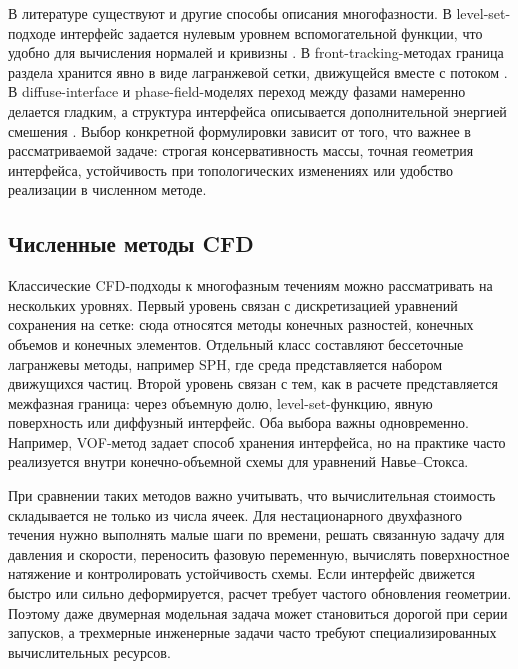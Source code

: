 \documentclass[12pt,a4paper]{article}
\begin{document}
В литературе существуют и другие способы описания многофазности. В
level-set-подходе интерфейс задается нулевым уровнем вспомогательной функции,
что удобно для вычисления нормалей и кривизны \cite{Osher1988}. В
front-tracking-методах граница раздела хранится явно в виде лагранжевой сетки,
движущейся вместе с потоком \cite{Tryggvason2001}. В diffuse-interface и
phase-field-моделях переход между фазами намеренно делается гладким, а
структура интерфейса описывается дополнительной энергией смешения
\cite{Anderson1998}. Выбор конкретной формулировки зависит от того, что важнее
в рассматриваемой задаче: строгая консервативность массы, точная геометрия
интерфейса, устойчивость при топологических изменениях или удобство реализации
в численном методе.

\subsection{Численные методы CFD}

Классические CFD-подходы к многофазным течениям можно рассматривать на
нескольких уровнях. Первый уровень связан с дискретизацией уравнений сохранения
на сетке: сюда относятся методы конечных разностей, конечных объемов и конечных
элементов. Отдельный класс составляют бессеточные лагранжевы методы, например
SPH, где среда представляется набором движущихся частиц. Второй уровень связан
с тем, как в расчете представляется межфазная граница: через объемную долю,
level-set-функцию, явную поверхность или диффузный интерфейс. Оба выбора важны
одновременно. Например, VOF-метод задает способ хранения интерфейса, но на
практике часто реализуется внутри конечно-объемной схемы для уравнений
Навье--Стокса.

При сравнении таких методов важно учитывать, что вычислительная стоимость
складывается не только из числа ячеек. Для нестационарного двухфазного течения
нужно выполнять малые шаги по времени, решать связанную задачу для давления и
скорости, переносить фазовую переменную, вычислять поверхностное натяжение и
контролировать устойчивость схемы. Если интерфейс движется быстро или сильно
деформируется, расчет требует частого обновления геометрии. Поэтому даже
двумерная модельная задача может становиться дорогой при серии запусков, а
трехмерные инженерные задачи часто требуют специализированных вычислительных
ресурсов.
\end{document}
